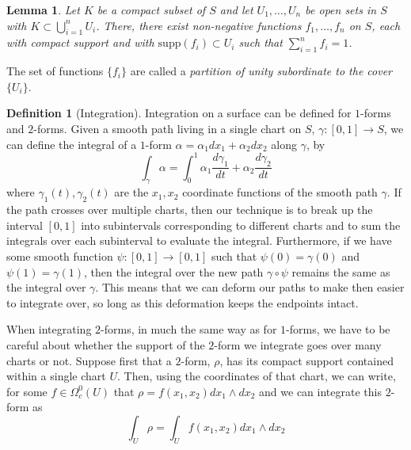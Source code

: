 \documentclass[11pt]{report}
\newtheorem{lemma}[thm]{Lemma}
\theoremstyle{definition}
\newtheorem{defn}[thm]{Definition}
\begin{document}
\begin{lemma}\cite[(p.64, Lemma 7)]{donaldson}
  Let $K$ be a compact subset of $S$ and let $U_1,\ldots,U_n$ be open sets in $S$ with $K \subset \bigcup\limits_{i=1}^n U_i$. There, there exist non-negative functions $f_1,\ldots,f_n$ on $S$, each with compact support and with $\text{supp}(f_i) \subset U_i$ such that $\sum\limits_{i=1}^n f_i = 1$.
\end{lemma}
The set of functions $\{f_i\}$ are called a \emph{partition of unity subordinate to the cover $\{U_i\}$}.

\begin{defn}[Integration]\label{Integration}
  Integration on a surface can be defined for $1$-forms and $2$-forms. Given a smooth path living in a single chart on $S$, $\gamma \colon [0,1] \rightarrow S$, we can define the integral of a $1$-form $\alpha = \alpha_1 dx_1 + \alpha_2 dx_2$ along $\gamma$, by 
  \[\int_{\gamma}\alpha = \int_0^1\alpha_1\frac{d\gamma_1}{dt}+\alpha_2\frac{d\gamma_2}{dt}\] where $\gamma_1(t),\gamma_2(t)$ are the $x_1, x_2$ coordinate functions of the smooth path $\gamma$. If the path crosses over multiple charts, then our technique is to break up the interval $[0,1]$ into subintervals corresponding to different charts and to sum the integrals over each subinterval to evaluate the integral. Furthermore, if we have some smooth function $\psi \colon [0,1] \rightarrow [0,1]$ such that $\psi(0)=\gamma(0)$ and $\psi(1)=\gamma(1)$, then the integral over the new path $\gamma \circ \psi$ remains the same as the integral over $\gamma$. This means that we can deform our paths to make then easier to integrate over, so long as this deformation keeps the endpoints intact.

  When integrating $2$-forms, in much the same way as for $1$-forms, we have to be careful about whether the support of the $2$-form we integrate goes over many charts or not. Suppose first that a $2$-form, $\rho$, has its compact support contained within a single chart $U$. Then, using the coordinates of that chart, we can write, for some $f\in \Omega_c^0(U)$ that $\rho=f(x_1,x_2)dx_1\wedge dx_2$ and we can integrate this $2$-form as 
  \[\int_U \rho = \int_U f(x_1,x_2)dx_1\wedge dx_2\]
  

\end{defn}
\end{document}
